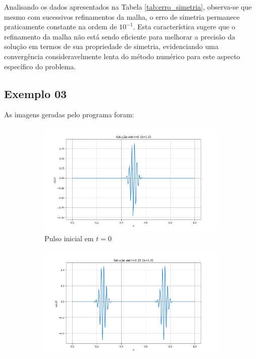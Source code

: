 \documentclass[column,amsmath,amssymb,floatfix]{revtex4}
\begin{document}
Analisando os dados apresentados na Tabela \ref{tab:erro_simetria}, observa-se que mesmo com sucessivos refinamentos da malha, o erro de simetria permanece praticamente constante na ordem de $10^{-1}$. Esta característica sugere que o refinamento da malha não está sendo eficiente para melhorar a precisão da solução em termos de sua propriedade de simetria, evidenciando uma convergência consideravelmente lenta do método numérico para este aspecto específico do problema.

\subsection{Exemplo 03}

As imagens geradas pelo programa foram:
\begin{figure}[H]
	\centering
	\begin{subfigure}{0.35\textwidth}
		\includegraphics[width=\textwidth]{img/ex0301.png}
		\caption{Pulso inicial em $t=0$}
		\label{fig:ex3_1}
	\end{subfigure}
	\begin{subfigure}{0.35\textwidth}
		\includegraphics[width=\textwidth]{img/ex0302.png}

\end{subfigure}
\end{figure}
\end{document}
